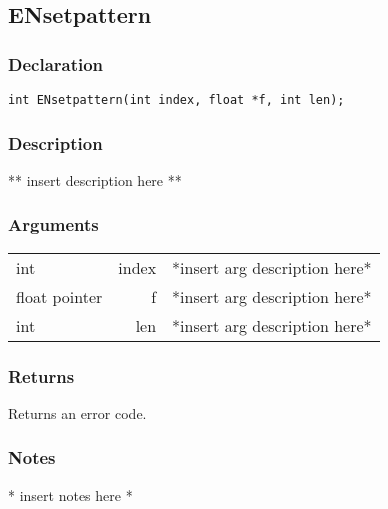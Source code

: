 \subsection{ENsetpattern}
\subsubsection{Declaration}
\begin{lstlisting}
int ENsetpattern(int index, float *f, int len);
\end{lstlisting}
\subsubsection{Description}
** insert description here **
\subsubsection{Arguments}
\begin{tabular}{l r p{11cm} }
int&index&*insert arg description here* \\[6pt]
float pointer&f&*insert arg description here* \\[6pt]
int&len&*insert arg description here* \\[6pt]
\end{tabular}
\subsubsection{Returns}
Returns an error code.
\subsubsection{Notes}
* insert notes here *